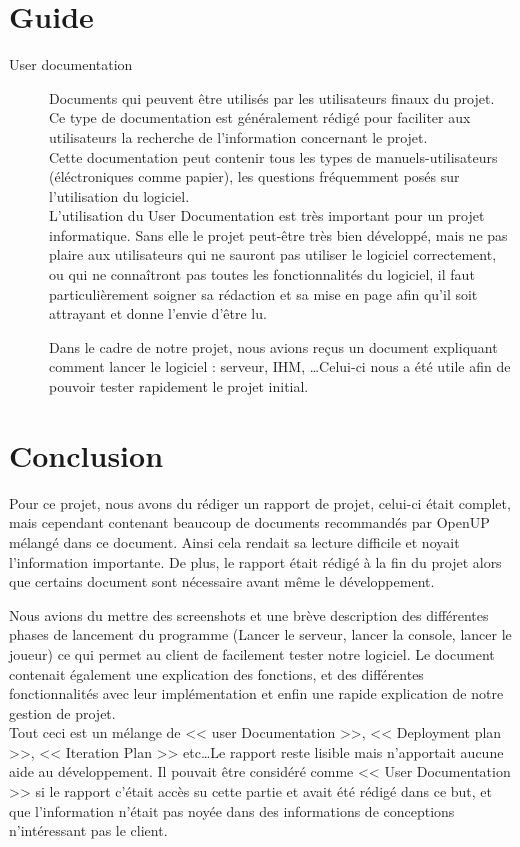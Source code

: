 \documentclass[a4paper, 12pt]{article}
\begin{document}
\section{Guide}
\begin{description}
	\item[User documentation] Documents qui peuvent être utilisés par les utilisateurs finaux du projet. Ce type de documentation est généralement rédigé
		pour faciliter aux utilisateurs la recherche de l'information concernant le projet. \\
	Cette documentation peut contenir tous les types de manuels-utilisateurs (éléctroniques comme papier), les questions fréquemment posés sur
	l'utilisation du logiciel. \\
	L'utilisation du User Documentation est très important pour un projet informatique. Sans elle le projet peut-être très bien développé, mais ne pas
	plaire aux utilisateurs qui ne sauront pas utiliser le logiciel correctement, ou qui ne connaîtront pas toutes les fonctionnalités du logiciel, 
	il faut particulièrement soigner sa rédaction et sa mise en page afin qu'il soit attrayant et donne l'envie d'être lu.

	Dans le cadre de notre projet, nous avions reçus un document expliquant comment lancer le logiciel : serveur, IHM, \ldots Celui-ci nous a été utile
	afin de pouvoir tester rapidement le projet initial.
	\end{description}

\section{Conclusion}
Pour ce projet, nous avons du rédiger un rapport de projet, celui-ci était complet, mais cependant contenant beaucoup de documents recommandés par
OpenUP mélangé dans ce document. Ainsi cela rendait sa lecture difficile et noyait l'information importante. De plus, le rapport était rédigé à la fin
du projet alors que certains document sont nécessaire avant même le développement.

Nous avions du mettre des screenshots et une brève description des différentes phases de lancement du programme (Lancer le serveur, lancer la console,
lancer le joueur) ce qui permet au client de facilement tester notre logiciel. Le document contenait également une explication des fonctions, et des différentes
fonctionnalités avec leur implémentation et enfin une rapide explication de notre gestion de projet.\\
Tout ceci est un mélange de << user Documentation >>, << Deployment plan >>, << Iteration Plan >> etc\ldots Le rapport reste lisible mais n'apportait
aucune aide au développement. Il pouvait être considéré comme << User Documentation >> si le rapport c'était accès su cette partie et avait été rédigé
dans ce but, et que l'information n'était pas noyée dans des informations de conceptions n'intéressant pas le client.
\end{document}
